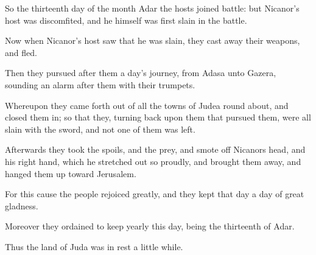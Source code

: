 {\par }{\PP {}So the thirteenth day of the month Adar the hosts joined battle: but Nicanor’s host was discomfited, and he himself was first slain in the battle.
\par }{\PP {}Now when Nicanor’s host saw that he was slain, they cast away their weapons, and fled.
\par }{\PP {}Then they pursued after them a day’s journey, from Adasa unto Gazera, sounding an alarm after them with their trumpets.
\par }{\PP {}Whereupon they came forth out of all the towns of Judea round about, and closed them in; so that they, turning back upon them that pursued them, were all slain with the sword, and not one of them was left.
\par }{\PP {}Afterwards they took the spoils, and the prey, and smote off Nicanors head, and his right hand, which he stretched out so proudly, and brought them away, and hanged them up toward Jerusalem.
\par }{\PP {}For this cause the people rejoiced greatly, and they kept that day a day of great gladness.
\par }{\PP {}Moreover they ordained to keep yearly this day, being the thirteenth of Adar.
\par }{\PP {}Thus the land of Juda was in rest a little while.

}
